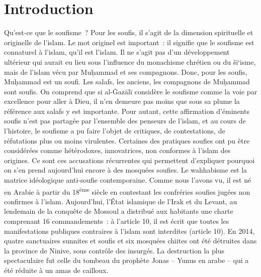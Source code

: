 \section{Introduction}
Qu'est-ce que le soufisme~? Pour les soufis, il s'agit de la dimension
spirituelle et originelle de l'islam. Le mot originel est important~: il
signifie que le soufisme est connaturel à l'islam, qu'il est l'islam. Il
ne s'agit pas d'un développement ultérieur qui aurait eu lieu sous
l'influence du monachisme chrétien ou du šī`isme, mais de l'islam vécu
par Muḥammad et ses compagnons. Donc, pour les soufis, Muḥammad est un
soufi. Les salafs, les anciens, les compagnons de Muḥammad sont soufis.
On comprend que si al-Ġazālī \label{theol:AlGazali27} considère le soufisme comme la voie par
excellence pour aller à Dieu, il n'en demeure pas moins que sous sa
plume la référence aux salafs y est importante.
Pour autant, cette affirmation d'éminents soufis n'est pas partagée par
l'ensemble des penseurs de l'islam, et au cours de l'histoire, le
soufisme a pu faire l'objet de critiques, de contestations, de
réfutations plus ou moins virulentes. Certaines des pratiques soufies
ont pu être considérées comme hétérodoxes, innovatrices, non conformes à
l'islam des origines. Ce sont ces accusations récurrentes qui permettent
d'expliquer pourquoi on s'en prend aujourd'hui encore à des mosquées
soufies. Le wahhabisme est la matrice idéologique anti-soufie
contemporaine. Comme nous l'avons vu, il est né en Arabie à partir du
18\textsuperscript{ème} siècle en contestant les confréries soufies
jugées non confirmes à l'islam. Aujourd'hui, l'État islamique de l'Irak
et du Levant, au lendemain de la conquête de Mossoul a distribué aux
habitants une charte comprenant 16 commandements~: à l'article 10, il
est écrit que toutes les manifestations publiques contraires à l'islam
sont interdites (article 10). En 2014, quatre sanctuaires sunnites et
soufis et six mosquées chiites ont été détruites dans la province de
Ninive, sous contrôle des insurgés. La destruction la plus spectaculaire
fut celle du tombeau du prophète Jonas -- Yunus en arabe -- qui a été
réduite à un amas de cailloux.

